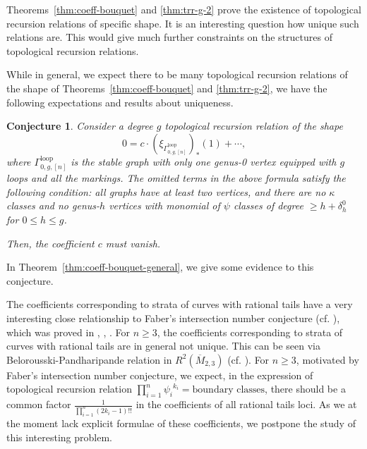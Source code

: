 \documentclass[12pt,reqno]{amsart}
\newcommand{\Gammaloop}{\Gamma^\mathrm{loop}}
\theoremstyle{plain}
\newtheorem{conjecture}[theorem]{Conjecture}
\theoremstyle{definition}
\theoremstyle{remark}
\begin{document}
Theorems~\ref{thm:coeff-bouquet} and \ref{thm:trr-g-2} prove the
existence of topological recursion relations of specific shape.
It is an interesting question how unique such relations are.
This would give much further constraints on the structures of
topological recursion relations.

While in general, we expect there to be many topological recursion
relations of the shape of Theorems~\ref{thm:coeff-bouquet} and
\ref{thm:trr-g-2}, we have the following expectations and results
about uniqueness.
\begin{conjecture}
  \label{conj:bouquet-unique}
  Consider a degree $g$ topological recursion relation of the shape
  \begin{equation*}
    0 = c \cdot \left(\xi_{\Gammaloop_{0,g,[n]}}\right)_*(1)+\cdots,
  \end{equation*}
  where $\Gammaloop_{0,g,[n]}$ is the stable graph with only one genus-0
  vertex equipped with $g$ loops and all the markings.
  The omitted terms in the above formula satisfy the following
  condition: all graphs have at least two vertices, and there are no
  $\kappa$ classes and no genus-$h$ vertices with monomial of $\psi$
  classes of degree $\geq h+\delta_{h}^0$ for $0\leq h\leq g$.

  Then, the coefficient $c$ must vanish.
\end{conjecture}
In Theorem~\ref{thm:coeff-bouquet-general}, we give some evidence to this conjecture.

The coefficients corresponding to strata of curves with rational tails have a very interesting close relationship to Faber's intersection number conjecture (cf. \cite[Conjecture~1(c)]{faber1999conjectural}), which was proved in \cite{liu2009proof}, \cite{buryak2011new}, \cite{garcia2022curious}. 
For $n\geq3$, the coefficients corresponding to strata of curves with rational tails are in general not unique.
This can be seen via Belorousski-Pandharipande relation in $R^2(\overline{M}_{2,3})$ (cf. \cite{belorousski2000descendent}).
For $n\geq3$, motivated by Faber's intersection number conjecture, we expect, in the expression of topological recursion relation $\prod_{i=1}^{n}{\psi_{i}}^{k_i}=\text{boundary classes}$, there should be a common factor $\frac{1}{\prod_{i=1}^{n}(2k_i-1)!!}$ in the coefficients of all rational tails loci.
As we at the moment lack explicit formulae of these coefficients, we postpone the study of this interesting problem.
\end{document}
